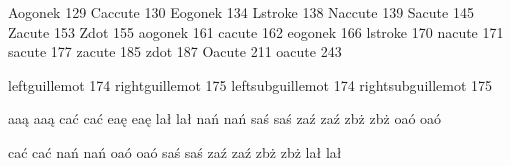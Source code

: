 \startencoding[pl0]

 Aogonek  129
 Caccute  130
 Eogonek  134
 Lstroke  138
 Naccute  139
 Sacute   145
 Zacute   153
 Zdot     155
 aogonek  161 
 cacute   162 
 eogonek  166 
 lstroke  170 
 nacute   171 
 sacute   177
 zacute   185
 zdot     187
 Oacute   211
 oacute   243

\stopencoding 

\startencoding[pl0]

 leftguillemot      174  %
 rightguillemot     175  %
 leftsubguillemot   174  %
 rightsubguillemot  175  %

\stopencoding

\startencoding[pl0]

 {a}{a}{\k a}    {a}{a}{\k a}
 {c}{a}{\'c}     {c}{a}{\'c}
 {e}{a}{\k e}    {e}{a}{\k e}
 {l}{a}{\l }     {l}{a}{\l }
 {n}{a}{\'n}     {n}{a}{\'n}
 {s}{a}{\'s}     {s}{a}{\'s}
 {z}{a}{\'z}     {z}{a}{\'z}
 {z}{b}{\.z}     {z}{b}{\.z}
 {o}{a}{\'o}     {o}{a}{\'o}

 {c}{a}{\'c}     {c}{a}{\'c}
 {n}{a}{\'n}     {n}{a}{\'n}
 {o}{a}{\'o}     {o}{a}{\'o}
 {s}{a}{\'s}     {s}{a}{\'s}
 {z}{a}{\'z}     {z}{a}{\'z}
 {z}{b}{\.z}     {z}{b}{\.z}
   
   
 {l}{a}{\l}      {l}{a}{\l}

\stopencoding


\startmapping[pl1]


